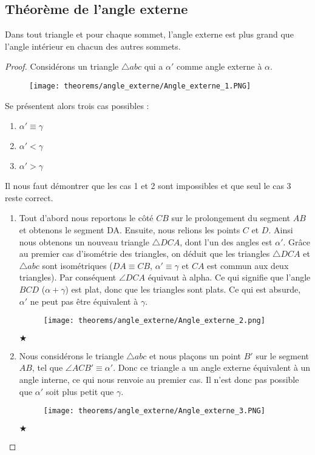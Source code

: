 \documentclass[a4paper,12pt]{article}
\begin{document}
\subsection{Théorème de l'angle externe}
\begin{theorem}
Dans tout triangle et pour chaque sommet, l'angle externe est plus grand que l'angle intérieur en chacun des autres sommets.
\end{theorem}

\begin{proof}
Considérons un triangle $\triangle abc$ qui a $\alpha'$ comme angle externe à $\alpha$.
\begin{figure}[H]
    \centering
    \texttt{[image: theorems/angle\_externe/Angle\_externe\_1.PNG]}
\end{figure}

Se présentent alors trois cas possibles :

\begin{enumerate}
    \item $\alpha'  \equiv \gamma$
    \item $\alpha' < \gamma$
    \item $\alpha' > \gamma$
\end{enumerate}
Il nous faut démontrer que les cas 1 et 2 sont impossibles et que seul le cas 3 reste correct.
\begin{enumerate}

    \item Tout d'abord nous reportons le côté $CB$ sur le prolongement du segment $AB$ et obtenons le segment DA. Ensuite, nous relions les points $C$ et $D$. Ainsi nous obtenons un nouveau triangle $\triangle DCA$, dont l'un des angles est $\alpha'$.
	Grâce au premier cas d'isométrie des triangles, on déduit que les triangles $\triangle DCA$ et $\triangle abc$ sont isométriques ($DA \equiv CB$, $\alpha'\equiv \gamma$ et $CA$ est commun aux deux triangles). 
	Par conséquent $\angle{DCA}$ équivaut à alpha. Ce qui signifie que l'angle $BCD$ ($\alpha + \gamma$) est plat, donc que les triangles sont plats.
	Ce qui est absurde, $\alpha'$ ne peut pas être équivalent à $\gamma$. 
    \begin{figure}[H]
        \centering
        \texttt{[image: theorems/angle\_externe/Angle\_externe\_2.png]}
    \end{figure}
	\begin{flushright}
    $\bigstar $
    \end{flushright}
    
    \item Nous considérons le triangle $\triangle abc$ et nous plaçons un point $B'$ sur le segment $AB$, tel que $\angle{ACB'} \equiv \alpha'$.
     Donc ce triangle a un angle externe équivalent à un angle interne, ce qui nous renvoie au premier cas. 
     Il n'est donc pas possible que $\alpha'$ soit plus petit que $\gamma$.
     \begin{figure}[H]
    \centering
    \texttt{[image: theorems/angle\_externe/Angle\_externe\_3.PNG]}
\end{figure}
     \begin{flushright}
    $\bigstar $
    \end{flushright}


\end{enumerate}
\end{proof}
\end{document}
